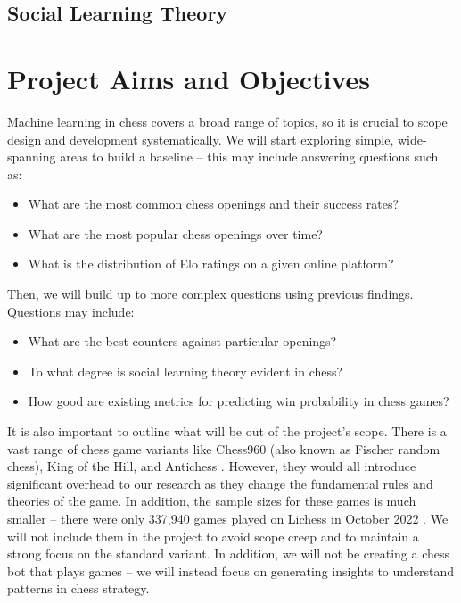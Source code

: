 \documentclass[%
 superscriptaddress,
showpacs,preprintnumbers,
 amsmath,
 amssymb,
 aps,
 pra,
showkeys,
onecolumn,
notitlepage,
11pt,
tightenlines      %
]{revtex4-1}
\begin{document}
\subsection{Social Learning Theory}



\section{Project Aims and Objectives}
Machine learning in chess covers a broad range of topics, so it is crucial to scope design and development systematically. We will start exploring simple, wide-spanning areas to build a baseline -- this may include answering questions such as:

\begin{itemize}
    \item What are the most common chess openings and their success rates?
    \item What are the most popular chess openings over time?
    \item What is the distribution of Elo ratings on a given online platform?
\end{itemize}

Then, we will build up to more complex questions using previous findings. Questions may include:
\begin{itemize}
    \item What are the best counters against particular openings?
    \item To what degree is social learning theory evident in chess?
    \item How good are existing metrics for predicting win probability in chess games?
\end{itemize}

It is also important to outline what will be out of the project's scope. There is a vast range of chess game variants like Chess960 (also known as Fischer random chess), King of the Hill, and Antichess \cite{lichessBlitzRatingDistribution}. However, they would all introduce significant overhead to our research as they change the fundamental rules and theories of the game. In addition, the sample sizes for these games is much smaller -- there were only 337,940 games played on Lichess in October 2022 \cite{lichessOpenDatabase}. We will not include them in the project to avoid scope creep and to maintain a strong focus on the standard variant. In addition, we will not be creating a chess bot that plays games -- we will instead focus on generating insights to understand patterns in chess strategy.
\end{document}
